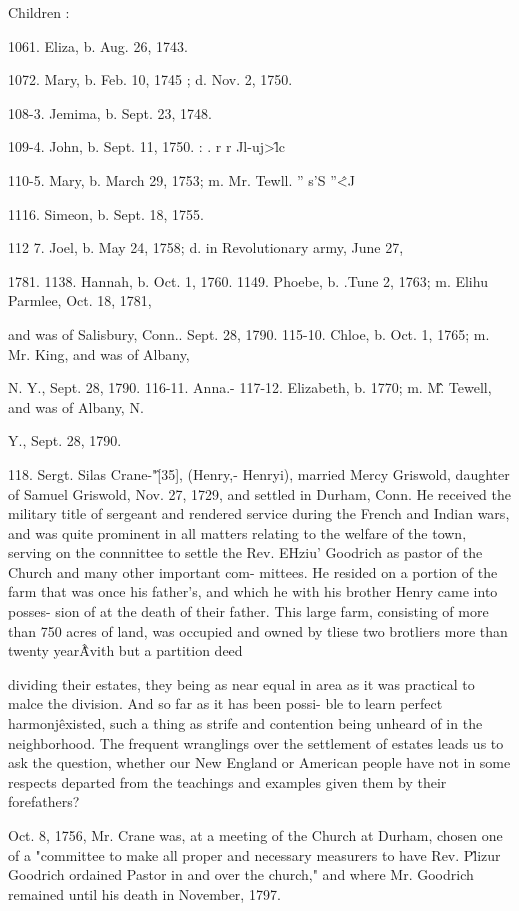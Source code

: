 Children : 

1061. Eliza, b. Aug. 26, 1743. 

1072. Mary, b. Feb. 10, 1745 ; d. Nov. 2, 1750. 

108-3. Jemima, b. Sept. 23, 1748. 

109-4. John, b. Sept. 11, 1750. : . r r Jl-uj>\^ lc 

110-5. Mary, b. March 29, 1753; m. Mr. Tewll. '' s'S ''\^ <J 

1116. Simeon, b. Sept. 18, 1755. 

112  7. Joel, b. May 24, 1758; d. in Revolutionary army, June 27, 

1781. 
1138. Hannah, b. Oct. 1, 1760. 
1149. Phoebe, b. .Tune 2, 1763; m. Elihu Parmlee, Oct. 18, 1781, 

and was of Salisbury, Conn.. Sept. 28, 1790. 
115-10. Chloe, b. Oct. 1, 1765; m. Mr. King, and was of Albany, 

N. Y., Sept. 28, 1790. 
116-11. Anna.- 
117-12. Elizabeth, b. 1770; m. M\^\^. Tewell, and was of Albany, N. 

Y., Sept. 28, 1790. 

118. Sergt. Silas Crane-"\^ [35], (Henry,- Henryi), married 
Mercy Griswold, daughter of Samuel Griswold, Nov. 27, 1729, 
and settled in Durham, Conn. He received the military title of 
sergeant and rendered service during the French and Indian wars, 
and was quite prominent in all matters relating to the welfare of 
the town, serving on the connnittee to settle the Rev. EHziu' 
Goodrich as pastor of the Church and many other important com- 
mittees. He resided on a portion of the farm that was once his 
father's, and which he with his brother Henry came into posses- 
sion of at the death of their father. This large farm, consisting 
of more than 750 acres of land, was occupied and owned by tliese 
two brotliers more than twenty year\^\^ Avith but a partition deed 




dividing their estates, they being as near equal in area as it was 
practical to malce the division. And so far as it has been possi- 
ble to learn perfect harmonj\^ existed, such a thing as strife and 
contention being unheard of in the neighborhood. The frequent 
wranglings over the settlement of estates leads us to ask the 
question, whether our New England or American people have not 
in some respects departed from the teachings and examples given 
them by their forefathers? 

Oct. 8, 1756, Mr. Crane was, at a meeting of the Church at 
Durham, chosen one of a "committee to make all proper and 
necessary measurers to have Rev. P\^lizur Goodrich ordained Pastor 
in and over the church," and where Mr. Goodrich remained until 
his death in November, 1797. 

